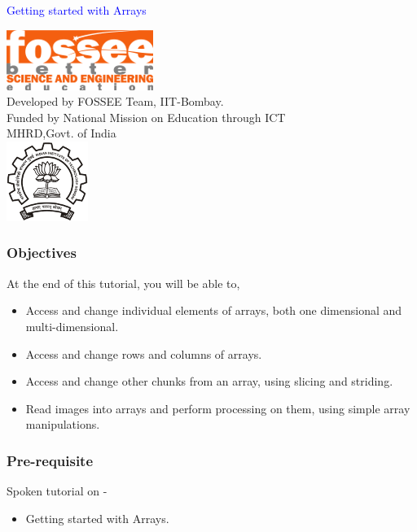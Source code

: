 \documentclass[presentation]{beamer}
\title{}
\author{FOSSEE}
\date{}
\begin{document}
\begin{frame}

\begin{center}
\vspace{12pt}
\textcolor{blue}{\huge Getting started with Arrays}
\end{center}
\vspace{18pt}
\begin{center}
\vspace{10pt}
\includegraphics[scale=0.95]{../images/fossee-logo.png}\\
\vspace{5pt}
\scriptsize Developed by FOSSEE Team, IIT-Bombay. \\ 
\scriptsize Funded by National Mission on Education through ICT\\
\scriptsize  MHRD,Govt. of India\\
\includegraphics[scale=0.30]{../images/iitb-logo.png}\\
\end{center}
\end{frame}
\begin{frame}
\frametitle{Objectives}
\label{sec-2}

  At the end of this tutorial, you will be able to,
   

\begin{itemize}
\item Access and change individual elements of arrays, both one
    dimensional and multi-dimensional.
\item Access and change rows and columns of arrays.
\item Access and change other chunks from an array, using slicing
    and striding.
\item Read images into arrays and perform processing on them, using
    simple array manipulations.
\end{itemize}
\end{frame}
\begin{frame}
\frametitle{Pre-requisite}
\label{sec-3}


Spoken tutorial on -
\begin{itemize}
\item Getting started with Arrays.
\end{itemize}
\end{frame}
\end{document}
